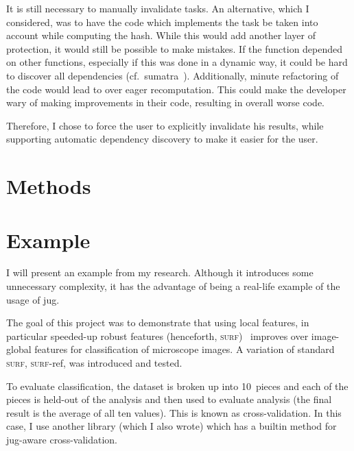 \documentclass{article}
\begin{document}
It is still necessary to manually invalidate tasks. An alternative, which I
considered, was to have the code which implements the task be taken into
account while computing the hash. While this would add another layer of
protection, it would still be possible to make mistakes. If the function
depended on other functions, especially if this was done in a dynamic way, it
could be hard to discover all dependencies (cf.\ sumatra~\citep{sumatra}).
Additionally, minute refactoring of the code would lead to over eager
recomputation. This could make the developer wary of making improvements in
their code, resulting in overall worse code.

Therefore, I chose to force the user to explicitly invalidate his results,
while supporting automatic dependency discovery to make it easier for the user.

\section{Methods}
\section{Example}
I will present an example from my research. Although it introduces some
unnecessary complexity, it has the advantage of being a real-life example of
the usage of jug.

The goal of this project was to demonstrate that using local features, in
particular speeded-up robust features (henceforth,
\textsc{surf})~\cite{surf-paper} improves over image-global features for
classification of microscope images. A variation of standard \textsc{surf},
\textsc{surf}-ref, was introduced and tested.

To evaluate classification, the dataset is broken up into 10~pieces and each of
the pieces is held-out of the analysis and then used to evaluate analysis (the
final result is the average of all ten values). This is known as
cross-validation. In this case, I use another library (which I also wrote)
which has a builtin method for jug-aware cross-validation.
\end{document}
